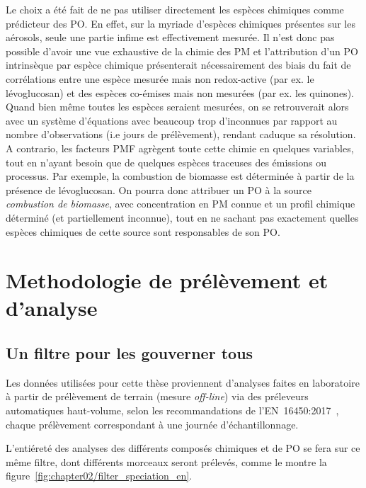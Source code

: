 Le choix a été fait de ne pas utiliser directement les espèces chimiques comme prédicteur
des PO. En effet, sur la myriade d'espèces chimiques présentes sur les aérosols, seule une
partie infime est effectivement mesurée. Il n'est donc pas possible d'avoir une vue
exhaustive de la chimie des PM et l'attribution d'un PO intrinsèque par espèce chimique
présenterait nécessairement des biais du fait de corrélations entre une espèce mesurée mais
non redox-active (par ex. le lévoglucosan) et des espèces co-émises mais non mesurées (par ex. les
quinones). Quand bien même toutes les espèces seraient mesurées, on se retrouverait alors
avec un système d'équations avec beaucoup trop d'inconnues par rapport au nombre
d'observations (i.e jours de prélèvement), rendant caduque sa résolution.
A contrario, les facteurs PMF agrègent toute cette chimie en quelques variables, tout en
n'ayant besoin que de quelques espèces traceuses des émissions ou processus. Par exemple,
la combustion de biomasse est déterminée à partir de la présence de lévoglucosan. On pourra
donc attribuer un PO à la source \textit{combustion de biomasse}, avec concentration en PM
connue et un profil chimique déterminé (et partiellement inconnue), tout en ne sachant
pas exactement quelles espèces chimiques de cette source sont responsables de son PO.



\section{Methodologie de prélèvement et d'analyse}%
\label{sec:methodologie_de_prélèvement_et_d_analyse}

\subsection{Un filtre pour les gouverner tous}%
\label{sub:un_filtre_pour_les_gouverner_tous}

Les données utilisées pour cette thèse proviennent d'analyses faites en laboratoire à
partir de prélèvement de terrain (mesure \textit{off-line}) via des préleveurs
automatiques haut-volume, selon les recommandations de
l'EN~16450:2017~\autocite{cenAmbient2017a}, chaque prélèvement correspondant à une
journée d'échantillonnage. 

L'entiéreté des analyses des différents composés chimiques et de PO se fera sur ce même
filtre, dont différents morceaux seront prélevés, comme le montre la
figure~\ref{fig:chapter02/filter_speciation_en}.


